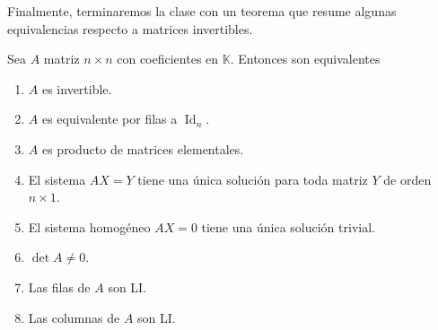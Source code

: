 \documentclass[handout]{beamer} %
\newcommand{\Id}{\operatorname{Id}}
\newcommand{\K}{\mathbb K}
\begin{document}
\begin{frame}
Finalmente, terminaremos la clase  con un teorema que resume algunas equivalencias respecto a matrices invertibles.

\begin{teorema}
Sea $A$ matriz $n \times n$ con coeficientes en $\K$. Entonces son equivalentes\pause
\begin{enumerate} 
    \item $A$ es invertible.\pause
    \item $A$  es equivalente por filas a $\Id_n$.\pause
    \item $A$ es producto de matrices elementales.\pause
    \item El sistema $AX=Y$ tiene una única solución para toda matriz $Y$ de orden $n \times 1$. \pause
    \item El sistema homogéneo $AX=0$ tiene una única solución trivial.\pause
    \item $\det A \ne 0$.\pause
    \item Las filas de $A$ son LI.\pause
    \item Las columnas de $A$ son LI.
\end{enumerate}
\end{teorema}
\end{frame}
\end{document}
